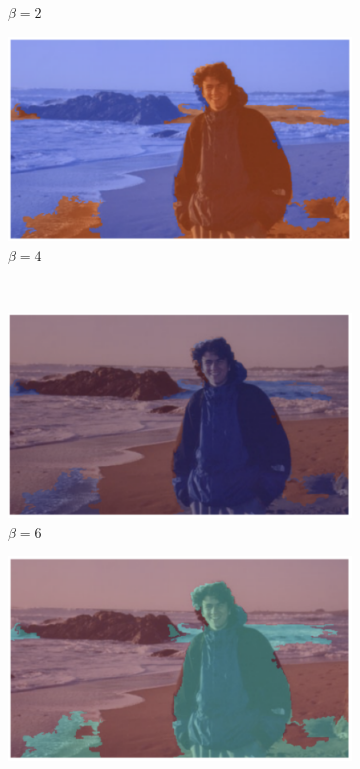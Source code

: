\documentclass{article}
\begin{document}
\begin{enumerate}[(a)]
\begin{figure}[H]
\begin{subfigure}[b]{0.3\textwidth}
        \caption{$\beta = 2$}
    \end{subfigure}
    \hfill
    \begin{subfigure}[b]{0.3\textwidth}
        \centering
        \includegraphics[width=\textwidth]{beta4.png}
        \caption{$\beta = 4$}
    \end{subfigure}
    \\
    \begin{subfigure}[b]{0.3\textwidth}
        \centering
        \includegraphics[width=\textwidth]{beta6.png}
        \caption{$\beta = 6$}
    \end{subfigure}
    \hfill
    \begin{subfigure}[b]{0.3\textwidth}
        \centering
        \includegraphics[width=\textwidth]{beta8.png}

\end{subfigure}
\end{figure}
\end{enumerate}
\end{document}
